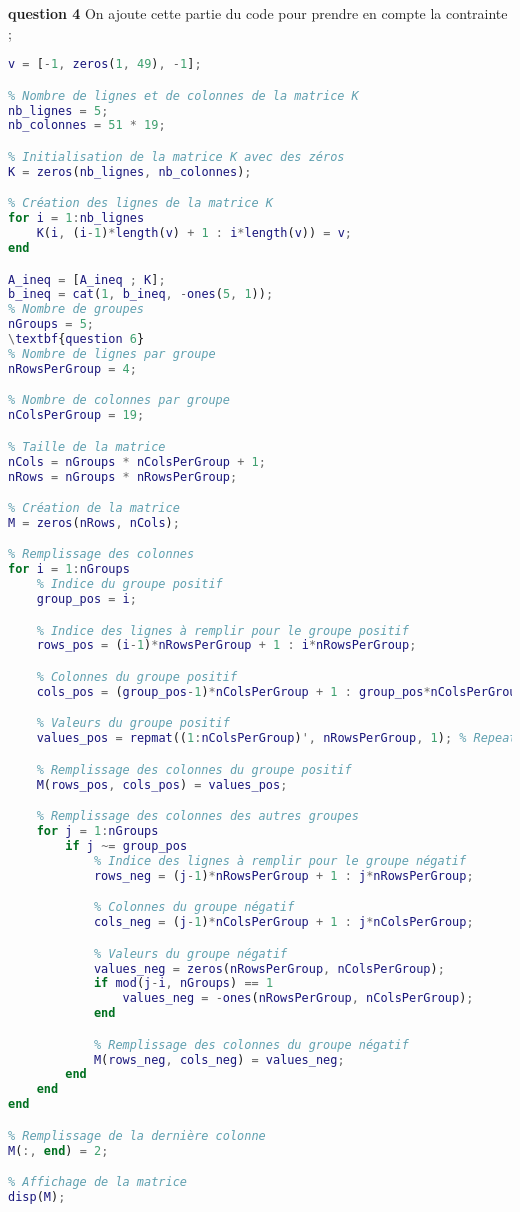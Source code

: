\textbf{question 4}
On ajoute cette partie du code pour prendre en compte la contrainte ; 
\begin{lstlisting}[language=Matlab, caption={Votre code MATLAB}]
% Création du vecteur v
v = [-1, zeros(1, 49), -1];

% Nombre de lignes et de colonnes de la matrice K
nb_lignes = 5;
nb_colonnes = 51 * 19;

% Initialisation de la matrice K avec des zéros
K = zeros(nb_lignes, nb_colonnes);

% Création des lignes de la matrice K
for i = 1:nb_lignes
    K(i, (i-1)*length(v) + 1 : i*length(v)) = v;
end

A_ineq = [A_ineq ; K];
b_ineq = cat(1, b_ineq, -ones(5, 1));
% Nombre de groupes
nGroups = 5;
\textbf{question 6}
% Nombre de lignes par groupe
nRowsPerGroup = 4;

% Nombre de colonnes par groupe
nColsPerGroup = 19;

% Taille de la matrice
nCols = nGroups * nColsPerGroup + 1;
nRows = nGroups * nRowsPerGroup;

% Création de la matrice
M = zeros(nRows, nCols);

% Remplissage des colonnes
for i = 1:nGroups
    % Indice du groupe positif
    group_pos = i;

    % Indice des lignes à remplir pour le groupe positif
    rows_pos = (i-1)*nRowsPerGroup + 1 : i*nRowsPerGroup;

    % Colonnes du groupe positif
    cols_pos = (group_pos-1)*nColsPerGroup + 1 : group_pos*nColsPerGroup;

    % Valeurs du groupe positif
    values_pos = repmat((1:nColsPerGroup)', nRowsPerGroup, 1); % Repeat the array to make it the correct size

    % Remplissage des colonnes du groupe positif
    M(rows_pos, cols_pos) = values_pos;

    % Remplissage des colonnes des autres groupes
    for j = 1:nGroups
        if j ~= group_pos
            % Indice des lignes à remplir pour le groupe négatif
            rows_neg = (j-1)*nRowsPerGroup + 1 : j*nRowsPerGroup;

            % Colonnes du groupe négatif
            cols_neg = (j-1)*nColsPerGroup + 1 : j*nColsPerGroup;

            % Valeurs du groupe négatif
            values_neg = zeros(nRowsPerGroup, nColsPerGroup);
            if mod(j-i, nGroups) == 1
                values_neg = -ones(nRowsPerGroup, nColsPerGroup);
            end

            % Remplissage des colonnes du groupe négatif
            M(rows_neg, cols_neg) = values_neg;
        end
    end
end

% Remplissage de la dernière colonne
M(:, end) = 2;

% Affichage de la matrice
disp(M);

\end{lstlisting}